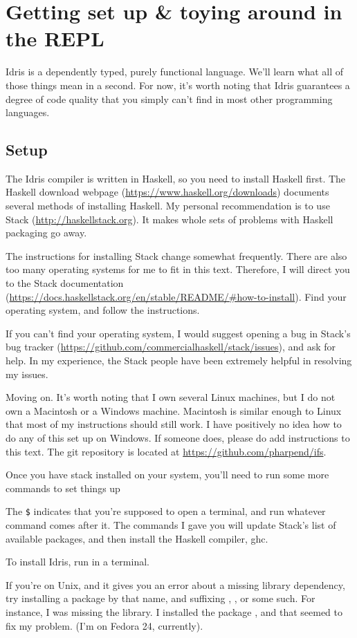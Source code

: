 \chapter{Getting set up \& toying around in the REPL}

Idris is a dependently typed, purely functional language. We'll learn
what all of those things mean in a second. For now, it's worth noting
that Idris guarantees a degree of code quality that you simply can't
find in most other programming languages.

\section{Setup}

The Idris compiler is written in Haskell, so you need to install
Haskell first. The Haskell download webpage
(\url{https://www.haskell.org/downloads}) documents several methods of
installing Haskell. My personal recommendation is to use Stack
(\url{http://haskellstack.org}). It makes whole sets of problems with
Haskell packaging go away.

The instructions for installing Stack change somewhat
frequently. There are also too many operating systems for me to fit in
this text. Therefore, I will direct you to the Stack documentation
(\url{https://docs.haskellstack.org/en/stable/README/#how-to-install}). Find
your operating system, and follow the instructions.

If you can't find your operating system, I would suggest opening a bug
in Stack's bug tracker
(\url{https://github.com/commercialhaskell/stack/issues}), and ask for
help. In my experience, the Stack people have been extremely helpful
in resolving my issues.

Moving on. It's worth noting that I own several Linux machines, but I
do not own a Macintosh or a Windows machine. Macintosh is similar
enough to Linux that most of my instructions should still work. I have
positively no idea how to do any of this set up on Windows. If someone
does, please do add instructions to this text. The git repository is
located at \url{https://github.com/pharpend/ifs}.

Once you have stack installed on your system, you'll need
to run some more commands to set things up


The \texttt{\$} indicates that you're supposed to open a terminal, and
run whatever command comes after it. The commands I gave you will
update Stack's list of available packages, and then install the
Haskell compiler, ghc.

To install Idris, run  in a terminal.

If you're on Unix, and it gives you an error about a missing library
dependency, try installing a package by that name, and suffixing
, , or some such. For instance, I was missing
the  library. I installed the package
, and that seemed to fix my problem. (I'm on
Fedora 24, currently).
